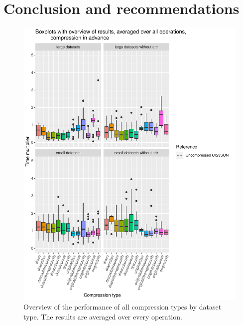 \newpage
\section{Conclusion and recommendations}
\label{bmconclusion}

\begin{figure}[h!]
    \includegraphics[scale=0.92]{figs/benchmark/overview/fulloverviewia.pdf}
    \caption{Overview of the performance of all compression types by dataset type. The results are averaged over every operation.}
    \label{fig:performanceoverview}
\end{figure}

